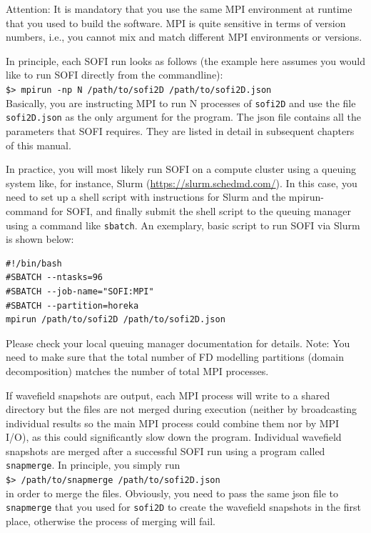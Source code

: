 \documentclass[11pt,english,a4paper]{article}
\newcommand{\RET}{\raisebox{2pt}{\scalebox{0.8}{\Return}}}
\begin{document}
Attention: It is mandatory that you use the same MPI environment at runtime that you used to build the software. MPI is quite sensitive in terms of version numbers, i.e., you cannot mix and match different MPI environments or versions.

In principle, each SOFI run looks as follows (the example here assumes you would like to run SOFI directly from the commandline):\\
\verb+$> mpirun -np N /path/to/sofi2D /path/to/sofi2D.json+\RET{}\\
Basically, you are instructing MPI to run N processes of \texttt{sofi2D} and use the file \texttt{sofi2D.json} as the only argument for the program. The json file contains all the parameters that SOFI requires. They are listed in detail in subsequent chapters of this manual.

In practice, you will most likely run SOFI on a compute cluster using a queuing system like, for instance, Slurm (\url{https://slurm.schedmd.com/}). In this case, you need to set up a shell script with instructions for Slurm and the mpirun-command for SOFI, and finally submit the shell script to the queuing manager using a command like \texttt{sbatch}. An exemplary, basic script to run SOFI via Slurm is shown below:
\begin{verbatim}
#!/bin/bash
#SBATCH --ntasks=96
#SBATCH --job-name="SOFI:MPI"
#SBATCH --partition=horeka
mpirun /path/to/sofi2D /path/to/sofi2D.json
\end{verbatim}
Please check your local queuing manager documentation for details. Note: You need to make sure that the total number of FD modelling partitions (domain decomposition) matches the number of total MPI processes.

If wavefield snapshots are output, each MPI process will write to a shared directory but the files are not merged during execution (neither by broadcasting individual results so the main MPI process could combine them nor by MPI I/O), as this could significantly slow down the program. Individual wavefield snapshots are merged after a successful SOFI run using a program called \texttt{snapmerge}. In principle, you simply run\\
\verb+$> /path/to/snapmerge /path/to/sofi2D.json+\RET{}\\
in order to merge the files. Obviously, you need to pass the same json file to \texttt{snapmerge} that you used for \texttt{sofi2D} to create the wavefield snapshots in the first place, otherwise the process of merging will fail.
\end{document}
